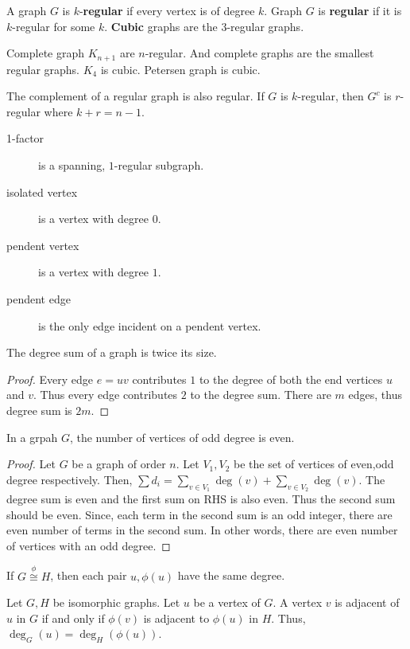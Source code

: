 \begin{definition}
	A graph $G$ is $k$-\textbf{regular} if every vertex is of degree $k$. Graph $G$ is \textbf{regular} if it is $k$-regular for some $k$. \textbf{Cubic} graphs are the $3$-regular graphs.
\end{definition}
\begin{remark}
	Complete graph $K_{n+1}$ are $n$-regular.
	And complete graphs are the smallest regular graphs.
	$K_4$ is cubic.
	Petersen graph is cubic.
\end{remark}
\begin{remark}
	The complement of a regular graph is also regular. If $G$ is $k$-regular, then $G^c$ is $r$-regular where $k+r = n-1$.
\end{remark}
\begin{description}
	\item[1-factor] is a spanning, $1$-regular subgraph.
	\item[isolated vertex] is a vertex with degree $0$.
	\item[pendent vertex] is a vertex with degree $1$.
	\item[pendent edge] is the only edge incident on a pendent vertex.
\end{description}

\begin{theorem}[Euler]
	The degree sum of a graph is twice its size.
\end{theorem}
\begin{proof}
	Every edge $e= uv$ contributes $1$ to the degree of both the end vertices $u$ and $v$. Thus every edge contributes $2$ to the degree sum. There are $m$ edges, thus degree sum is $2m$.
\end{proof}

\begin{corollary}
	In a grpah $G$, the number of vertices of odd degree is even.
\end{corollary}
\begin{proof}
	Let $G$ be a graph of order $n$.
	Let $V_1,V_2$ be the set of vertices of even,odd degree respectively.
	Then, $\sum d_i = \sum_{v \in V_1} \deg(v) + \sum_{v \in V_2} \deg(v)$.
	The degree sum is even and the first sum on RHS is also even. Thus the second sum should be even. Since, each term in the second sum is an odd integer, there are even number of terms in the second sum. In other words, there are even number of vertices with an odd degree.
\end{proof}
\begin{exercise} 
	If $G \overset{\phi}{\cong} H$, then each pair $u,\phi(u)$ have the same degree.
\end{exercise}
Let $G,H$ be isomorphic graphs.
Let $u$ be a vertex of $G$.
A vertex $v$ is adjacent of $u$ in $G$ if and only if $\phi(v)$ is adjacent to $\phi(u)$ in $H$. Thus, $\deg_G(u) = \deg_H(\phi(u))$.

